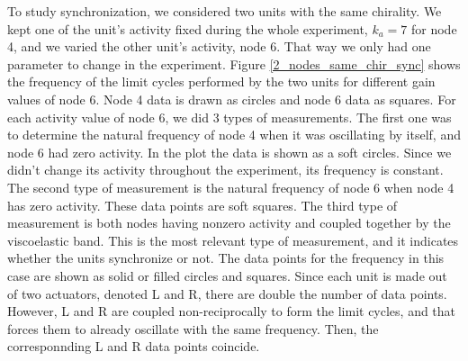 \documentclass[11pt, a4paper]{article} %
\begin{document}
To study synchronization, we considered two units with the same chirality. We kept one of the unit's activity fixed during the whole experiment, 
$k_a = 7$ for node 4, and we varied the other unit's activity, node 6. That way we only had one parameter to change in the experiment. 
Figure \ref{2_nodes_same_chir_sync} shows the frequency of the limit cycles performed by the two units for different gain 
values of node 6. Node 4 data is drawn as circles and node 6 data as squares. For each activity value of node 6, we did 3 types of measurements. 
The first one was to determine the natural frequency of node 4 when it was oscillating by itself, and node 6 had zero activity. 
In the plot the data is shown as a soft circles. Since we didn't change its activity throughout the experiment, 
its frequency is constant. The second type of measurement is the natural frequency of node 6 when node 4 has zero activity. 
These data points are soft squares. The third type of measurement is both nodes having nonzero activity and coupled together 
by the viscoelastic band. This is the most relevant type of measurement, and it indicates whether the units synchronize or not. 
The data points for the frequency in this case are shown as solid or filled circles and squares. 
Since each unit is made out of two actuators, denoted L and R, there are double the number of data points. However, L and R 
are coupled non-reciprocally to form the limit cycles, and that forces them to already oscillate with the same frequency. 
Then, the corresponnding L and R data points coincide. 
\end{document}
